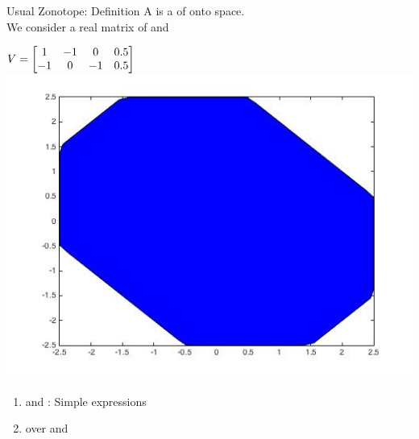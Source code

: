 
\begin{frame}{Usual Zonotope: Definition}
A  is a  of 
onto  space.\\[0.5em]
%
We consider a real matrix of  and 
\begin{block}{}
%
\end{block}
%
\vspace{0.5em}
%
\begin{minipage}{0.43\textwidth}
{\scriptsize $V=\left[\begin{matrix}1 &   -1 &          0 &    0.5 \\
   -1 &         0 &   -1 &    0.5\end{matrix}\right]$}
\includegraphics[scale=0.25]{figures/CZtopes/RealZonotope.jpg}
\end{minipage}
%
\vline
%
\begin{minipage}{0.55\textwidth}
\begin{enumerate}
\item {} and : Simple  expressions
\item {} over  and 
%
%
%
\end{enumerate}
%
\end{minipage}
%
\end{frame}

